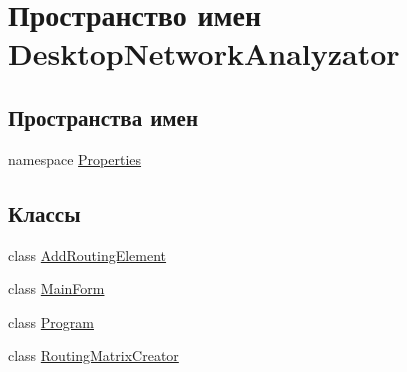 \hypertarget{namespace_desktop_network_analyzator}{}\section{Пространство имен Desktop\+Network\+Analyzator}
\label{namespace_desktop_network_analyzator}
\subsection*{Пространства имен}
\begin{DoxyCompactItemize}
\item 
namespace \hyperlink{namespace_desktop_network_analyzator_1_1_properties}{Properties}
\end{DoxyCompactItemize}
\subsection*{Классы}
\begin{DoxyCompactItemize}
\item 
class \hyperlink{class_desktop_network_analyzator_1_1_add_routing_element}{Add\+Routing\+Element}
\item 
class \hyperlink{class_desktop_network_analyzator_1_1_main_form}{Main\+Form}
\item 
class \hyperlink{class_desktop_network_analyzator_1_1_program}{Program}
\item 
class \hyperlink{class_desktop_network_analyzator_1_1_routing_matrix_creator}{Routing\+Matrix\+Creator}
\end{DoxyCompactItemize}

